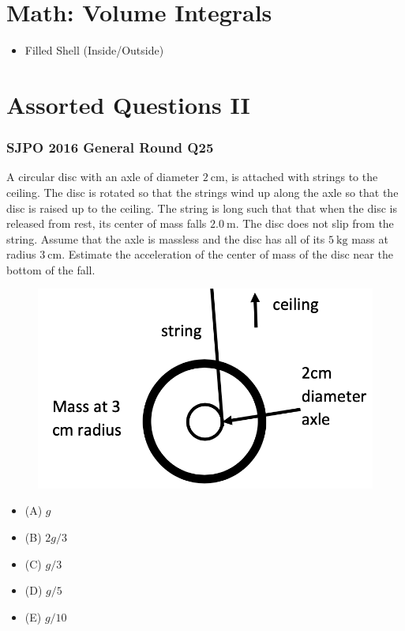 \documentclass{article}
\begin{document}
\section{Math: Volume Integrals}
\begin{itemize}
    \item Filled Shell (Inside/Outside)
\end{itemize}
\section{Assorted Questions II}
\subsubsection{SJPO 2016 General Round Q25}
A circular disc with an axle of diameter $2 \mathrm{~cm}$, is attached with strings to the ceiling. The disc is rotated so that the strings wind up along the axle so that the disc is raised up to the ceiling. The string is long such that that when the disc is released from rest, its center of mass falls $2.0 \mathrm{~m}$. The disc does not slip from the string. Assume that the axle is massless and the disc has all of its $5 \mathrm{~kg}$ mass at radius $3 \mathrm{~cm}$. Estimate the acceleration of the center of mass of the disc near the bottom of the fall. \\
{
\begin{figure} 
\includegraphics[width=\linewidth]{images/sjpo2016q25.png}
\end{figure}
\begin{itemize}
\item[](A) $g$
\item[](B) $2 g / 3$
\item[](C) $g / 3$
\item[](D) $g / 5$
\item[](E) $g / 10$
\end{itemize}
}
\end{document}

